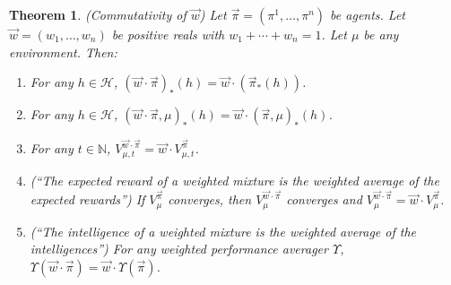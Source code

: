 \documentclass{article}
\newtheorem{theorem}{Theorem}
\begin{document}
\begin{theorem}
\label{maintheorem}
    (Commutativity of $\vec w$)
    Let $\vec\pi=(\pi^1,\ldots,\pi^n)$ be agents.
    Let $\vec w=(w_1,\ldots,w_n)$ be positive reals with
    $w_1+\cdots+w_n=1$. Let $\mu$ be any environment.
    Then:
    \begin{enumerate}
        \item
        For any $h\in\mathcal H$,
        $(\vec w\cdot\vec\pi)_*(h)=\vec w\cdot(\vec\pi_*(h))$.
        \item
        For any $h\in\mathcal H$,
        $(\vec w\cdot \vec\pi,\mu)_*(h)=\vec w\cdot(\vec\pi,\mu)_*(h)$.
        \item
        For any $t\in\mathbb N$,
        $V^{\vec w\cdot \vec\pi}_{\mu,t}=\vec w\cdot V^{\vec\pi}_{\mu,t}$.
        \item
        (``The expected reward of a weighted mixture is the weighted
        average of the expected rewards'')
        If $V^{\vec\pi}_\mu$ converges, then $V^{\vec w\cdot\vec\pi}_\mu$
        converges and $V^{\vec w\cdot\vec\pi}_\mu=\vec w\cdot V^{\vec\pi}_\mu$.
        \item
        (``The intelligence of a weighted mixture is the weighted average
        of the intelligences'')
        For any weighted performance averager $\Upsilon$,
        $\Upsilon(\vec w\cdot\vec\pi)=\vec w\cdot\Upsilon(\vec\pi)$.
    \end{enumerate}
\end{theorem}
\end{document}
